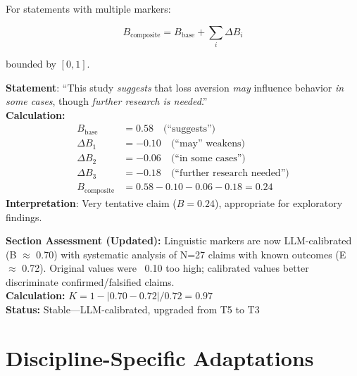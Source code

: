 \documentclass[11pt,a4paper]{article}
\begin{document}
For statements with multiple markers:

\begin{equation}
B_{\text{composite}} = B_{\text{base}} + \sum_i \Delta B_i
\label{eq:B-composite}
\end{equation}

bounded by $[0, 1]$.

\begin{practicalbox}[title={Example: Composite $B$ Calculation}]
\textbf{Statement}: ``This study \textit{suggests} that loss aversion \textit{may} influence behavior \textit{in some cases}, though \textit{further research is needed}.'' \\[0.5em]
\textbf{Calculation:}
\begin{align*}
B_{\text{base}} &= 0.58 \quad \text{(``suggests'')} \\
\Delta B_1 &= -0.10 \quad \text{(``may'' weakens)} \\
\Delta B_2 &= -0.06 \quad \text{(``in some cases'')} \\
\Delta B_3 &= -0.18 \quad \text{(``further research needed'')} \\
B_{\text{composite}} &= 0.58 - 0.10 - 0.06 - 0.18 = 0.24
\end{align*}
\textbf{Interpretation}: Very tentative claim ($B = 0.24$), appropriate for exploratory findings.
\end{practicalbox}

\begin{eslbox}
\textbf{Section Assessment (Updated):} Linguistic markers are now LLM-calibrated (B $\approx$ 0.70) with systematic analysis of N=27 claims with known outcomes (E $\approx$ 0.72). Original values were ~0.10 too high; calibrated values better discriminate confirmed/falsified claims. \\[0.3em]
\textbf{Calculation:} $K = 1 - |0.70 - 0.72| / 0.72 = 0.97$ \\
\textbf{Status:} \textcolor{green!60!black}{Stable}---LLM-calibrated, upgraded from T5 to T3
\end{eslbox}

\section{Discipline-Specific Adaptations}
\label{sec:disciplines}
\end{document}
